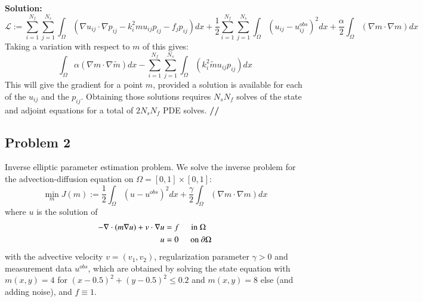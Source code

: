 \documentclass[11pt]{article}
\newenvironment{solution}{\begin{trivlist}\item[]{\bf Solution:}}
                      {\textbf{//} \end{trivlist}}
\begin{document}
\begin{enumerate}
\begin{solution}
\begin{displaymath}
\mathcal{L} := \sum_{i=1}^{N_f}\sum_{j=1}^{N_s}\int_{\Omega}\left(\nabla
 u_{ij} \cdot \nabla p_{ij} - k_i^2mu_{ij}p_{ij} - f_jp_{ij}\right)dx +
 \frac{1}{2}\sum_{i=1}^{N_f}\sum_{j=1}^{N_s}\int_{\Omega}\left(u_{ij} -
 u_{ij}^{obs}\right)^2 dx + \frac{\alpha}{2}\int_{\Omega}(\nabla m \cdot
 \nabla m) dx 
\end{displaymath}
Taking a variation with respect to $m$ of this gives:
\begin{displaymath} 
\int_{\Omega} \alpha (\nabla m \cdot \nabla\tilde{m})dx -
 \sum_{i=1}^{N_f}\sum_{j=1}^{N_s}\int_{\Omega}(k_i^2\tilde{m}u_{ij}p_{ij})dx 
\end{displaymath}
This will give the gradient for a point $m$, provided a solution is
 available for each of the $u_{ij}$ and the $p_{ij}$. Obtaining those
 solutions requires $N_sN_f$ solves of the state and adjoint equations
 for a total of $2N_sN_f$ PDE solves. 
\end{solution}
\end{enumerate}

\newpage
\subsection*{Problem 2}
Inverse elliptic parameter estimation problem. We solve the inverse
problem for the advection-diffusion equation on $\Omega = [0, 1] × [0,
1]$: 
\begin{displaymath}
\min_m J(m) := \frac{1}{2}\int_\Omega \left(u - u^{obs}\right)^2dx +
 \frac{\gamma}{2}\int_\Omega(\nabla m \cdot \nabla m )dx 
\end{displaymath}
where $u$ is the solution of
\begin{align}
-\nabla \cdot (m\nabla u)+v \cdot \nabla u &= f \hspace{5 mm} \text{in }
 \Omega \nonumber \\ 
u &= 0 \hspace{5 mm} \text{on } \partial\Omega \nonumber
\end{align}
with the advective velocity $v = (v_1, v_2)$, regularization parameter
$\gamma > 0$ and measurement data $u^{obs}$, which are obtained by
solving the state equation with $m(x,y) = 4$ for $(x-0.5)^2+(y-0.5)^2
\leq 0.2$ and $m(x,y) = 8$ else (and adding noise), and $f \equiv 1$. 
\end{document}

